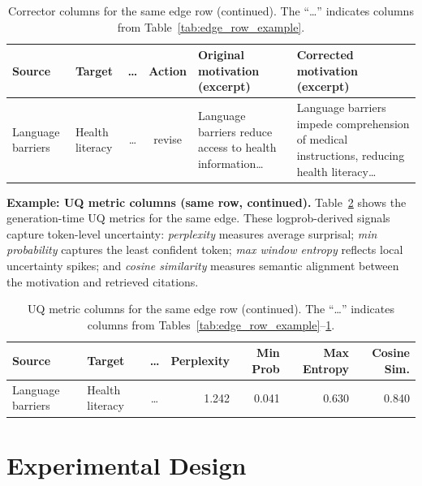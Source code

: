 \begin{table}[H]
\centering
\footnotesize
\setlength{\tabcolsep}{4pt}
\begin{tabularx}{\textwidth}{@{}l l c c X X@{}}
\toprule
\textbf{Source} & \textbf{Target} & \textbf{\ldots} & \textbf{Action} & \textbf{Original motivation (excerpt)} & \textbf{Corrected motivation (excerpt)} \\
\midrule
Language barriers & Health literacy & \ldots & revise &
Language barriers reduce access to health information\ldots &
Language barriers impede comprehension of medical instructions, reducing health literacy\ldots \\
\bottomrule
\end{tabularx}
\caption[Example corrector columns]{Corrector columns for the same edge row (continued). The ``\ldots'' indicates columns from Table~\ref{tab:edge_row_example}.}
\label{tab:corrector_row_example}
\end{table}

\noindent\textbf{Example: UQ metric columns (same row, continued).} Table~\ref{tab:uq_row_example} shows the generation-time UQ metrics for the same edge. These logprob-derived signals capture token-level uncertainty: \textit{perplexity} measures average surprisal; \textit{min probability} captures the least confident token; \textit{max window entropy} reflects local uncertainty spikes; and \textit{cosine similarity} measures semantic alignment between the motivation and retrieved citations.

\begin{table}[H]
\centering
\footnotesize
\begin{tabular}{@{}l l c r r r r@{}}
\toprule
\textbf{Source} & \textbf{Target} & \textbf{\ldots} & \textbf{Perplexity} & \textbf{Min Prob} & \textbf{Max Entropy} & \textbf{Cosine Sim.} \\
\midrule
Language barriers & Health literacy & \ldots & 1.242 & 0.041 & 0.630 & 0.840 \\
\bottomrule
\end{tabular}
\caption[Example UQ metric columns]{UQ metric columns for the same edge row (continued). The ``\ldots'' indicates columns from Tables~\ref{tab:edge_row_example}--\ref{tab:corrector_row_example}.}
\label{tab:uq_row_example}
\end{table}

\FloatBarrier
\clearpage
\chapter{Experimental Design}
\label{sec:experimental_design}

